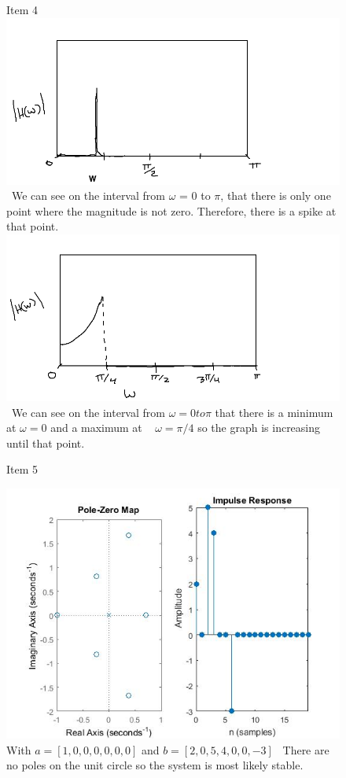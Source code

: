 \documentclass{article}
\begin{document}
\begin{figure}[H]
\Report Item 4
\includegraphics[scale = .5]{report4_1}
\ We can see on the interval from $\omega$ = $0$ to $\pi$, that there is only one point where the magnitude is not zero. Therefore, there is a spike at that point.
\includegraphics[scale = .5]{report4_2}
\ We can see on the interval from $\omega = 0 to \pi $ that there is a minimum at $\omega = 0$ and a maximum at ~ $\omega = \pi/4$ so the graph is increasing until that point.
\end{figure}

\begin{figure}[H]
\Report Item 5

\includegraphics[scale = .5]{report5_1}
\\ With $a = [1,0,0,0,0,0,0]$ and $b =[2,0,5,4,0,0,-3]$
\ There are no poles on the unit circle so the system is most likely stable.
\end{figure}
\end{document}
